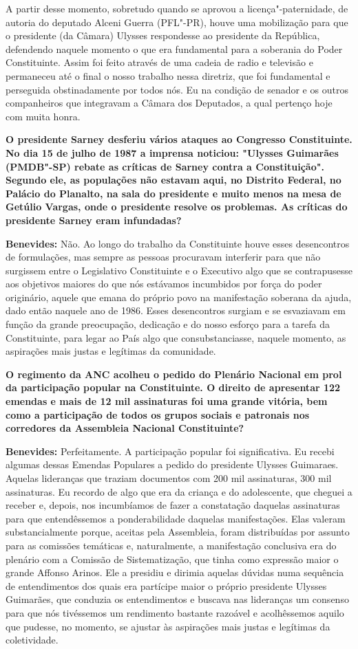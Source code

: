 A partir desse momento, sobretudo quando se aprovou a
licença"-paternidade, de autoria do deputado Alceni Guerra (PFL"-PR),
houve uma mobilização para que o presidente (da Câmara) Ulysses
respondesse ao presidente da República, defendendo naquele momento o que
era fundamental para a soberania do Poder Constituinte. Assim foi feito
através de uma cadeia de radio e televisão e permaneceu até o final o
nosso trabalho nessa diretriz, que foi fundamental e perseguida
obstinadamente por todos nós. Eu na condição de senador e os outros
companheiros que integravam a Câmara dos Deputados, a qual pertenço hoje
com muita honra.

\textbf{O presidente Sarney desferiu vários ataques ao Congresso
Constituinte. No dia 15 de julho de 1987 a imprensa noticiou: "Ulysses
Guimarães (PMDB"-SP) rebate as críticas de Sarney contra a Constituição".
Segundo ele, as populações não estavam aqui, no Distrito Federal, no
Palácio do Planalto, na sala do presidente e muito menos na mesa de
Getúlio Vargas, onde o presidente resolve os problemas. As críticas do
presidente Sarney eram infundadas?}

\textbf{Benevides:} Não. Ao longo do trabalho da Constituinte houve
esses desencontros de formulações, mas sempre as pessoas procuravam
interferir para que não surgissem entre o Legislativo Constituinte e o
Executivo algo que se contrapusesse aos objetivos maiores do que nós
estávamos incumbidos por força do poder originário, aquele que emana do
próprio povo na manifestação soberana da ajuda, dado então naquele ano
de 1986. Esses desencontros surgiam e se esvaziavam em função da grande
preocupação, dedicação e do nosso esforço para a tarefa da Constituinte,
para legar ao País algo que consubstanciasse, naquele momento, as
aspirações mais justas e legítimas da comunidade.

\textbf{O regimento da ANC acolheu o pedido do Plenário Nacional em prol
da participação popular na Constituinte. O direito de apresentar 122
emendas e mais de 12 mil assinaturas foi uma grande vitória, bem como a
participação de todos os grupos sociais e patronais nos corredores da
Assembleia Nacional Constituinte?}

\textbf{Benevides:} Perfeitamente. A participação popular foi
significativa. Eu recebi algumas dessas Emendas Populares a pedido do
presidente Ulysses Guimaraes. Aquelas lideranças que traziam documentos
com 200 mil assinaturas, 300 mil assinaturas. Eu recordo de algo que era
da criança e do adolescente, que cheguei a receber e, depois, nos
incumbíamos de fazer a constatação daquelas assinaturas para que
entendêssemos a ponderabilidade daquelas manifestações. Elas valeram
substancialmente porque, aceitas pela Assembleia, foram distribuídas por
assunto para as comissões temáticas e, naturalmente, a manifestação
conclusiva era do plenário com a Comissão de Sistematização, que tinha
como expressão maior o grande Affonso Arinos. Ele a presidiu e dirimia
aquelas dúvidas numa sequência de entendimentos dos quais era partícipe
maior o próprio presidente Ulysses Guimarães, que conduzia os
entendimentos e buscava nas lideranças um consenso para que nós
tivéssemos um rendimento bastante razoável e acolhêssemos aquilo que
pudesse, no momento, se ajustar às aspirações mais justas e legítimas da
coletividade.

